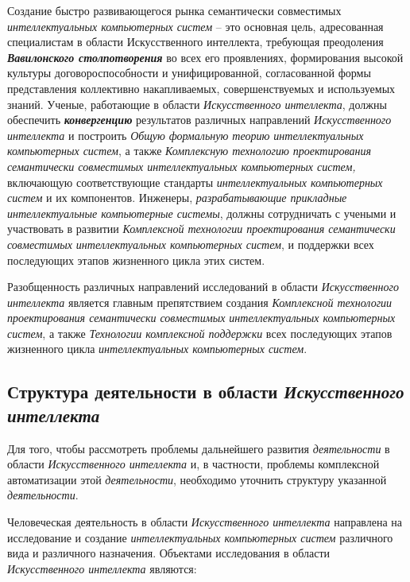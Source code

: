 Создание быстро развивающегося рынка семантически совместимых \textit{интеллектуальных компьютерных систем} -- это основная цель, адресованная специалистам в области Искусственного интеллекта, требующая преодоления \textbf{\textit{Вавилонского столпотворения}} во всех его проявлениях, формирования высокой культуры договороспособности и унифицированной, согласованной формы представления коллективно накапливаемых, совершенствуемых и используемых знаний. Ученые, работающие в области \textit{Искусственного интеллекта}, должны обеспечить \textbf{\textit{конвергенцию}} результатов различных направлений \textit{Искусственного интеллекта} и построить \textit{Общую формальную теорию интеллектуальных компьютерных систем}, а также \textit{Комплексную технологию проектирования семантически совместимых интеллектуальных компьютерных систем,} включающую соответствующие стандарты \textit{интеллектуальных компьютерных систем} и их компонентов. Инженеры, \textit{разрабатывающие прикладные интеллектуальные компьютерные системы}, должны сотрудничать с учеными и участвовать в развитии \textit{Комплексной технологии проектирования семантически совместимых интеллектуальных компьютерных систем}, и поддержки всех последующих этапов жизненного цикла этих систем.

Разобщенность различных направлений исследований в области \textit{Искусственного интеллекта} является главным препятствием создания \textit{Комплексной технологии проектирования семантически совместимых интеллектуальных компьютерных систем}, а также \textit{Технологии комплексной поддержки} всех последующих этапов жизненного цикла \textit{интеллектуальных компьютерных систем}.

\subsection{Структура деятельности в области \textit{Искусственного интеллекта}}

Для того, чтобы рассмотреть проблемы дальнейшего развития \textit{деятельности} в области \textit{Искусственного интеллекта} и, в частности, проблемы комплексной автоматизации этой \textit{деятельности}, необходимо уточнить структуру указанной \textit{деятельности}.

Человеческая деятельность в области \textit{Искусственного интеллекта} направлена на исследование и создание \textit{интеллектуальных компьютерных систем} различного вида и различного назначения. Объектами исследования в области \textit{Искусственного интеллекта} являются:

